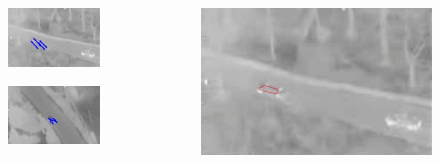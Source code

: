 \begin{frame}
\begin{columns}
\begin{column}{1in}
			\begin{figure}
				\includegraphics[width=1.5\textwidth]{figs/TRK_IGARSS2010_matching_0_30.jpg}
			\end{figure}
			\begin{figure}
				\includegraphics[width=1.5\textwidth]{figs/TRK_IGARSS2010_matching_1250_1277.jpg}
			\end{figure}
		\end{column}
		\begin{column}{1in}
			\begin{figure}
				\includegraphics[width=1.5\textwidth]{figs/TRK_IGARSS2010_00030_contour.jpg}

\end{figure}
\end{column}
\end{columns}
\end{frame}
